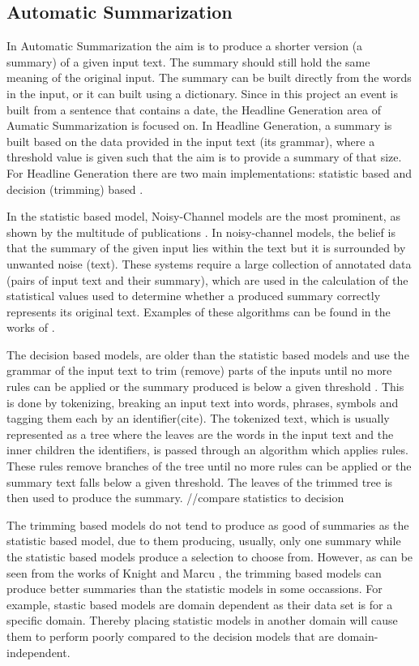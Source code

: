 \subsection{Automatic Summarization}
\par In Automatic Summarization the aim is to produce a shorter version (a summary) of a given input text. The summary should still hold the same meaning of the original input. The summary can be built directly from the words in the input, or it can built using a dictionary. Since in this project an event is built from a sentence that contains a date, the Headline Generation area of Aumatic Summarization is focused on. In Headline Generation, a summary is built based on the data provided in the input text (its grammar), where a threshold value is given such that the aim is to provide a summary of that size. For Headline Generation there are two main implementations: statistic based and decision (trimming) based \cite{daumemarcu2002}.
\par In the statistic based model, Noisy-Channel models are the most prominent, as shown by the multitude of publications \cite{daumemarcu2002,rushchopraweston2015,chopraaulirush2016}. In noisy-channel models, the belief is that the summary of the given input lies within the text but it is surrounded by unwanted noise (text). These systems require a large collection of annotated data (pairs of input text and their summary), which are used in the calculation of the statistical values used to determine whether a produced summary correctly represents its original text. Examples of these algorithms can be found in the works of \cite{daumemarcu2002,knightmarcu2000}.
\par The decision based models, are older than the statistic based models and use the grammar of the input text to trim (remove) parts of the inputs until no more rules can be applied or the summary produced is below a given threshold \cite{dorrzajicschwartz2003}. This is done by tokenizing, breaking an input text into words, phrases, symbols and tagging them each by an identifier(cite). The tokenized text, which is usually represented as a tree where the leaves are the words in the input text and the inner children the identifiers, is passed through an algorithm which applies rules. These rules remove branches of the tree until no more rules can be applied or the summary text falls below a given threshold. The leaves of the trimmed tree is then used to produce the summary.
//compare statistics to decision
\par The trimming based models do not tend to produce as good of summaries as the statistic based model, due to them producing, usually, only one summary while the statistic based models produce a selection to choose from. However, as can be seen from the works of Knight and Marcu \cite{knightmarcu2000}, the trimming based models can produce better summaries than the statistic models in some occassions. For example, stastic based models are domain dependent as their data set is for a specific domain. Thereby placing statistic models in another domain will cause them to perform poorly compared to the decision models that are domain-independent. 
